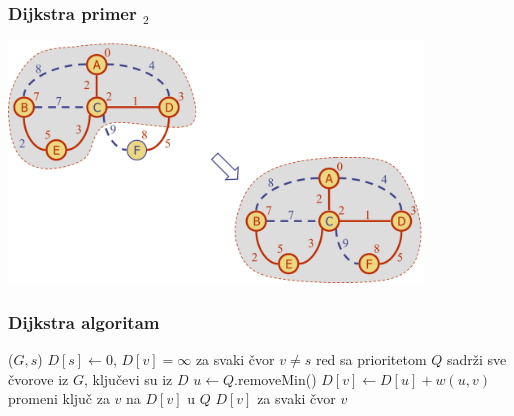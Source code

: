 \documentclass[compress]{beamer}
\begin{document}
\begin{frame}[fragile]
  \frametitle{Dijkstra primer $_2$}
  \begin{center}
    \includegraphics[width=11cm]{asp-14-pic63.png}
  \end{center}
\end{frame}

\begin{frame}[fragile]
  \frametitle{Dijkstra algoritam}
  \begin{algorithmic}
    \STATE {}($G,s$)
    \STATE $D[s] \leftarrow 0$, $D[v]=\infty$ za svaki čvor $v\neq s$
    \STATE red sa prioritetom $Q$ sadrži sve čvorove iz $G$, ključevi su iz $D$
      \STATE {}
      \STATE $u \leftarrow Q$.removeMin() 
        \STATE {}
          \STATE $D[v] \leftarrow D[u]+w(u,v)$
          \STATE promeni ključ za $v$ na $D[v]$ u $Q$
        \ENDIF
      \ENDFOR
    \ENDWHILE
    \RETURN $D[v]$ za svaki čvor $v$
  \end{algorithmic}
\end{frame}
\end{document}
